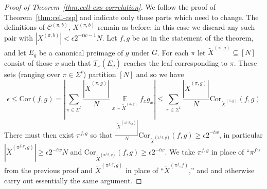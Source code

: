 \documentclass[11pt]{article}
\newcommand{\todo}[1]{\textcolor{red}{TODO: #1}}
\newcommand{\p}[1]{{(#1)}}
\newcommand{\E}{\mathop{\mathbb{E}}}
\newcommand{\N}{[N]}
\begin{document}
\begin{proof}[Proof of Theorem~\ref{thm:cell-csp-correlation}]
We follow the proof of Theorem~\ref{thm:cell-csp} and indicate only those parts which need to change. The definitions of $\mathcal{C}^\p{\pi,b}$, $X^\p{\pi,b}$ remain as before; in this case we discard any such pair with $|X^\p{\pi,b}| < \epsilon2^{-tw-1}N$. Let $f,g$ be as in the statement of the theorem, and let $E_{g}$ be a canonical preimage of $g$ under $G$. For each $\pi$ let $
\tilde{X}^\p{\pi,g} \subseteq \N $ consist of those $x$ such that $T_x(E_{g})$ reaches the leaf corresponding to $\pi$. These sets (ranging over $\pi\in \Sigma^t$) partition $\N$ and so we have
\[
\epsilon \leq \mathrm{Cor}(f,g)  = |\sum_{\pi\in \Sigma^t} \frac{|\tilde{X}^\p{\pi,g}|}{N} \E\limits_{x \sim \tilde{X}^\p{\pi,g}} f_xg_x|  \leq \sum_{\pi\in \Sigma^t} \frac{|\tilde{X}^\p{\pi,g}|}{N} \mathrm{Cor}_{\tilde{X}^\p{\pi,g}}(f,g)
\]
There must then exist $\pi^{f,g}$ so that $ \frac{|\tilde{X}^\p{\pi^{f,g},g}|}{N} \mathrm{Cor}_{\tilde{X}^\p{\pi^{f,g},g}}(f,g) \geq \epsilon 2^{-tw}$, in particular $|\tilde{X}^\p{\pi^{f,g},g}| \geq \epsilon 2^{-tw} N$ and $\mathrm{Cor}_{\tilde{X}^\p{\pi^{f,g},g}}(f,g) \geq \epsilon 2^{-tw}$. 
We take $\pi^{f,g}$ in place of ``$\pi^f$'' from the previous proof and $\tilde{X}^\p{\pi^{f,g},g}$ in place of ``$\tilde{X}^\p{\pi^f,f}$,'' and  and otherwise carry out essentially the same argument.


\end{proof}
\end{document}
